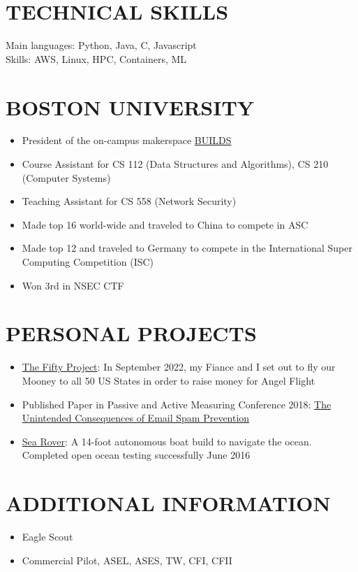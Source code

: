 \documentclass{res}
\begin{document}
\begin{resume}
\section{TECHNICAL SKILLS}          
    Main languages: Python, Java, C, Javascript \\         
    Skills: AWS, Linux, HPC, Containers, ML
\vspace{-0.10in}
\section{BOSTON UNIVERSITY}    
	\begin{itemize}
   	\setlength\itemsep{0em}
        \item President of the on-campus makerspace \href{http://builds.cc}{BUILDS}
        \item Course Assistant for CS 112 (Data Structures and Algorithms), CS 210 (Computer Systems)
        \item Teaching Assistant for CS 558 (Network Security)
        \item Made top 16 world-wide and traveled to China to compete in ASC
        \item Made top 12 and traveled to Germany to compete in the International Super Computing Competition (ISC)
        \item Won 3rd in NSEC CTF
        \end{itemize}
\vspace{-0.10in}
\section{PERSONAL PROJECTS}    
	\begin{itemize}
   	\setlength\itemsep{0em}   
         \item \href{https://thefiftyproject.com/}{The Fifty Project}: In September 2022, my Fiance and I set out to fly our Mooney to all 50 US States in order to raise money for Angel Flight
  		 \item Published Paper in Passive and Active Measuring Conference 2018: \href{https://www.cs.huji.ac.il/~yossigi/pam18.pdf}{The Unintended Consequences of Email Spam Prevention}
         \item \href{https://www.kickstarter.com/projects/bdommie/sea-rover}{Sea Rover}: A 14-foot autonomous boat build to navigate the ocean. Completed open ocean testing successfully June 2016
    		\end{itemize}
\vspace{-0.10in}
    \section{ADDITIONAL INFORMATION} 
    	\begin{itemize}
	\setlength\itemsep{0em}
  		\item Eagle Scout  
  		\item Commercial Pilot, ASEL, ASES, TW, CFI, CFII
	\end{itemize}           
 
\end{resume}
\end{document}
